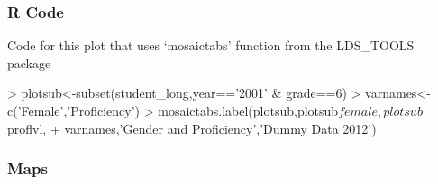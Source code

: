 \documentclass{beamer}
\begin{document}
\begin{frame}[containsverbatim]
\frametitle{R Code}
Code for this plot that uses `mosaictabs' function from the LDS\_TOOLS package
\vspace{.1in}
\begin{Schunk}
\begin{Sinput}
> plotsub<-subset(student_long,year=='2001' & grade==6)
> varnames<-c('Female','Proficiency')
> mosaictabs.label(plotsub,plotsub$female,plotsub$proflvl,
+                 varnames,'Gender and Proficiency','Dummy Data 2012')
\end{Sinput}
\end{Schunk}
\end{frame}


\begin{frame}
\frametitle{Maps}
\begin{center}
\end{center}
\end{frame}
\end{document}
